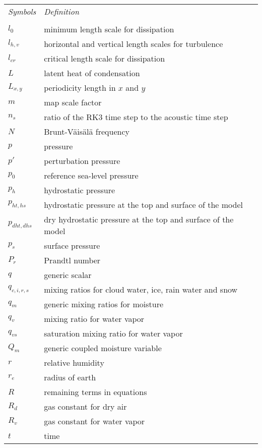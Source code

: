 \begin{tabular}{ l p{5.5in} }
{\em Symbols}  & {\em Definition} \\
\\
$l_0$          & minimum length scale for dissipation \\
$l_{h,v}$      & horizontal and vertical length scales for turbulence \\
$l_{cr}$       & critical length scale for dissipation \\
$L$            & latent heat of condensation \\
$L_{x,y}$      & periodicity length in $x$ and $y$ \\
$m$            & map scale factor \\ 
$n_s$          & ratio of the RK3 time step to the acoustic time step \\
$N$            & Brunt-V\"ais\"al\"a frequency \\
$p$            & pressure \\
$p'$           & perturbation pressure \\
$p_0$          & reference sea-level pressure \\
$p_h$          & hydrostatic pressure \\
$p_{ht,hs}$    & hydrostatic pressure at the top and surface of the model \\
$p_{dht,dhs}$  & dry hydrostatic pressure at the top and surface of the model \\
$p_s$          & surface pressure \\
$P_r$          & Prandtl number \\
$q$            & generic scalar \\
$q_{c,i,r,s}$  & mixing ratios for cloud water, ice, rain water and snow \\
$q_m$          & generic mixing ratios for moisture \\
$q_v$          & mixing ratio for water vapor \\
$q_{vs}$       & saturation mixing ratio for water vapor \\
$Q_m$          & generic coupled moisture variable \\
$r$            & relative humidity   \\
$r_e$          & radius of earth \\
$R$            & remaining terms in equations  \\
$R_d$          & gas constant for dry air \\
$R_v$          & gas constant for water vapor \\
$t$            & time \\

\end{tabular}

